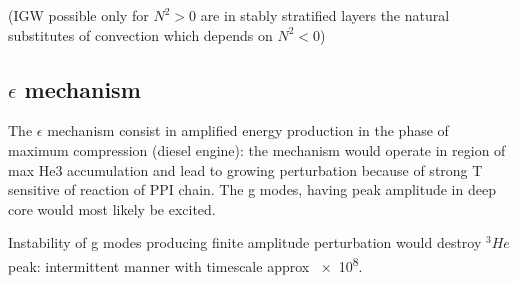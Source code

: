 \documentclass[../main.tex]{subfiles}
\begin{document}
(IGW possible only for $N^2>0$ are in stably stratified layers the natural substitutes of convection which depends on $N^2<0$)

\subsection{$\epsilon$ mechanism}

The $\epsilon$ mechanism consist in amplified energy production in the phase of maximum compression (diesel engine): the mechanism would operate in region of max He3 accumulation and lead to growing perturbation because of strong T sensitive of  reaction of PPI chain. The g modes, having peak amplitude in deep core would most likely be excited.

Instability of g modes producing finite amplitude perturbation would destroy $^3He$ peak: intermittent manner with timescale approx \SI{e8}{\year}.

\stopcontents[chapters]
\end{document}
